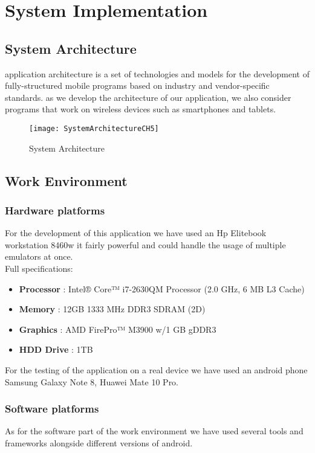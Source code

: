 \chapter{System Implementation} \label{chap:sysImplementation}

\section{System Architecture}
application architecture is a set of technologies and models for the development of fully-structured mobile programs based on industry and vendor-specific standards. as we develop the architecture of our application, we also consider programs that work on wireless devices such as smartphones and tablets.

\begin{figure}[ht]
\center
\texttt{[image: SystemArchitectureCH5]}
\caption{System Architecture}
\label{fig:System Architecture}
\end{figure}

\section{Work Environment}

\subsection{Hardware platforms}
For the development of this application we have used an Hp Elitebook workstation 8460w it fairly powerful and could handle the usage of multiple emulators at once.
\\ Full specifications:

\begin{itemize}
\item \textbf{Processor} : Intel® Core™ i7-2630QM Processor (2.0 GHz, 6 MB L3 Cache)
\item \textbf{Memory }: 12GB 1333 MHz DDR3 SDRAM (2D)
\item \textbf{Graphics }: AMD FirePro™ M3900 w/1 GB gDDR3
\item \textbf{HDD Drive }: 1TB
\end{itemize}

For the testing of the application on a real device we have used an android phone Samsung Galaxy Note 8, Huawei  Mate 10 Pro.

\subsection{Software platforms}
As for the software part of the work environment we have used several tools and frameworks alongside different versions of android.

